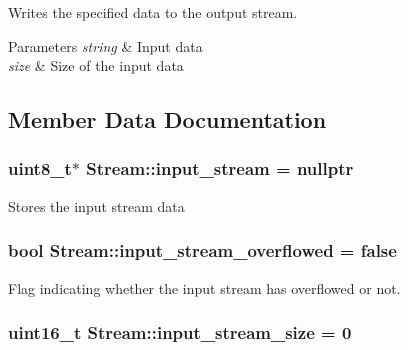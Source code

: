 Writes the specified data to the output stream. 
\begin{DoxyParams}{Parameters}
{\em string} & Input data \\
\hline
{\em size} & Size of the input data \\
\hline
\end{DoxyParams}


\subsection{Member Data Documentation}
\hypertarget{class_stream_aaa6b266a85844345faee432d0267c6ec}{
\subsubsection[{input\-\_\-stream}]{\setlength{\rightskip}{0pt plus 5cm}uint8\-\_\-t$\ast$ Stream\-::input\-\_\-stream = nullptr\hspace{0.3cm}{\ttfamily [protected]}}}\label{class_stream_aaa6b266a85844345faee432d0267c6ec}
Stores the input stream data \hypertarget{class_stream_aeffd88d8ca71bf0d084ded2a251e3a57}{
\subsubsection[{input\-\_\-stream\-\_\-overflowed}]{\setlength{\rightskip}{0pt plus 5cm}bool Stream\-::input\-\_\-stream\-\_\-overflowed = false\hspace{0.3cm}{\ttfamily [protected]}}}\label{class_stream_aeffd88d8ca71bf0d084ded2a251e3a57}
Flag indicating whether the input stream has overflowed or not. \hypertarget{class_stream_a8a754b0acc9552d1b78de92b2476f4cb}{
\subsubsection[{input\-\_\-stream\-\_\-size}]{\setlength{\rightskip}{0pt plus 5cm}uint16\-\_\-t Stream\-::input\-\_\-stream\-\_\-size = 0\hspace{0.3cm}{\ttfamily [protected]}}}\label{class_stream_a8a754b0acc9552d1b78de92b2476f4cb}
